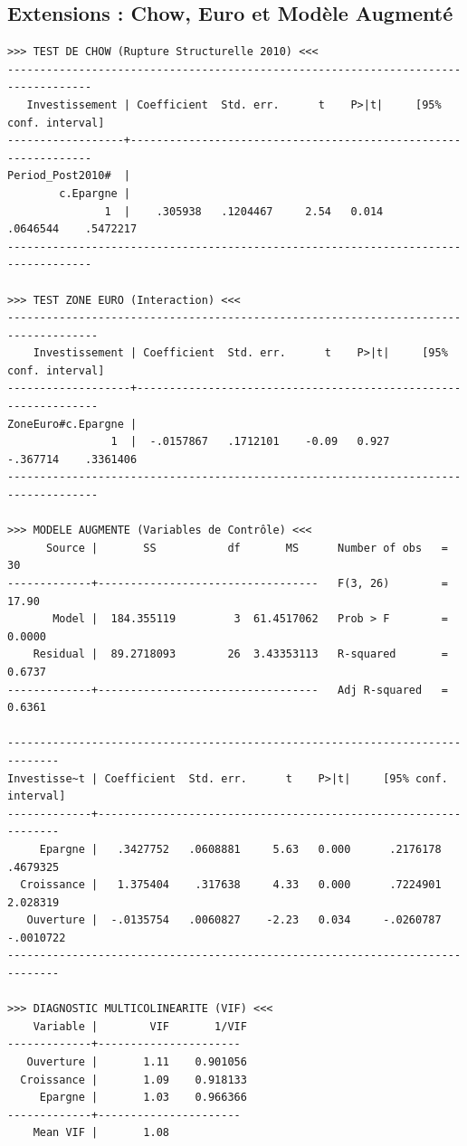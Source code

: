 \documentclass[12pt, a4paper]{article}
\begin{document}
{\subsection{Extensions : Chow, Euro et Modèle Augmenté}
\begin{verbatim}
>>> TEST DE CHOW (Rupture Structurelle 2010) <<<
-----------------------------------------------------------------------------------
   Investissement | Coefficient  Std. err.      t    P>|t|     [95% conf. interval]
------------------+----------------------------------------------------------------
Period_Post2010#  |
        c.Epargne |
               1  |    .305938   .1204467     2.54   0.014     .0646544    .5472217
-----------------------------------------------------------------------------------

>>> TEST ZONE EURO (Interaction) <<<
------------------------------------------------------------------------------------
    Investissement | Coefficient  Std. err.      t    P>|t|     [95% conf. interval]
-------------------+----------------------------------------------------------------
ZoneEuro#c.Epargne |
                1  |  -.0157867   .1712101    -0.09   0.927     -.367714    .3361406
------------------------------------------------------------------------------------

>>> MODELE AUGMENTE (Variables de Contrôle) <<<
      Source |       SS           df       MS      Number of obs   =        30
-------------+----------------------------------   F(3, 26)        =     17.90
       Model |  184.355119         3  61.4517062   Prob > F        =    0.0000
    Residual |  89.2718093        26  3.43353113   R-squared       =    0.6737
-------------+----------------------------------   Adj R-squared   =    0.6361

------------------------------------------------------------------------------
Investisse~t | Coefficient  Std. err.      t    P>|t|     [95% conf. interval]
-------------+----------------------------------------------------------------
     Epargne |   .3427752   .0608881     5.63   0.000      .2176178   .4679325
  Croissance |   1.375404    .317638     4.33   0.000      .7224901   2.028319
   Ouverture |  -.0135754   .0060827    -2.23   0.034     -.0260787  -.0010722
------------------------------------------------------------------------------

>>> DIAGNOSTIC MULTICOLINEARITE (VIF) <<<
    Variable |        VIF       1/VIF  
-------------+----------------------
   Ouverture |       1.11    0.901056
  Croissance |       1.09    0.918133
     Epargne |       1.03    0.966366
-------------+----------------------
    Mean VIF |       1.08
\end{verbatim}
} 
\end{document}

